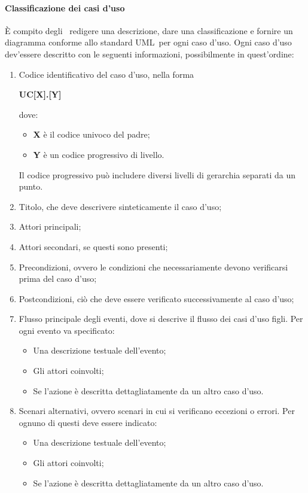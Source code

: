 \documentclass[../NormeProgetto.tex]{subfiles}
\begin{document}
				\paragraph{Classificazione dei casi d'uso}
					È compito degli \analisti\ redigere una descrizione, dare una classificazione e fornire un diagramma conforme allo standard UML\g\ per ogni caso d'uso. Ogni caso d'uso dev'essere descritto con le seguenti informazioni, possibilmente in quest'ordine:
					\begin{enumerate}
						\item Codice identificativo del caso d'uso, nella forma \begin{center}\textbf{UC[X].[Y]}\end{center} dove:
						\begin{itemize}
							\item \textbf{X} è il codice univoco del padre;
							\item \textbf{Y} è un codice progressivo di livello.
						\end{itemize}
						Il codice progressivo può includere diversi livelli di gerarchia separati da un punto.
						\item Titolo, che deve descrivere sinteticamente il caso d'uso;
						\item Attori principali;
						\item Attori secondari, se questi sono presenti;
						\item Precondizioni, ovvero le condizioni che necessariamente devono verificarsi prima del caso d'uso;
						\item Postcondizioni, ciò che deve essere verificato successivamente al caso d'uso;
						\item Flusso principale degli eventi, dove si descrive il flusso dei casi d'uso figli. Per ogni evento va specificato:
						\begin{itemize}
							\item Una descrizione testuale dell'evento;
							\item Gli attori coinvolti;
							\item Se l'azione è descritta dettagliatamente da un altro caso d'uso.
						\end{itemize}
						\item Scenari alternativi, ovvero scenari in cui si verificano eccezioni o errori. Per ognuno di questi deve essere indicato:
							\begin{itemize}
								\item Una descrizione testuale dell'evento;
								\item Gli attori coinvolti;
								\item Se l'azione è descritta dettagliatamente da un altro caso d'uso.
							\end{itemize}
					\end{enumerate}
\end{document}
